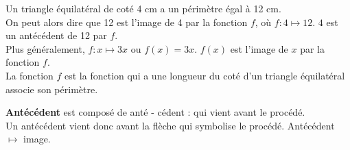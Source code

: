 \begin{Ex}
Un triangle équilatéral de coté 4 cm a un périmètre égal à 12 cm. \\
On peut alors dire que 12 est l'image de 4 par la fonction $f$, où $f : 4 \mapsto 12$. $4$ est un antécédent de 12 par $f$.\\Plus généralement, $f : x \mapsto 3x$ ou $f(x)=3x$. $f(x)$ est l'image de $x$ par la fonction $f$.\\
La fonction $f$ est la fonction qui a une longueur du coté d'un triangle équilatéral associe son périmètre.
\end{Ex}

\begin{Ety}
\textbf{Antécédent} est composé de anté - cédent : qui vient avant le procédé. \\Un antécédent vient donc avant la flèche qui symbolise  le procédé. Antécédent $\mapsto$  image.
\end{Ety}
 




 
 